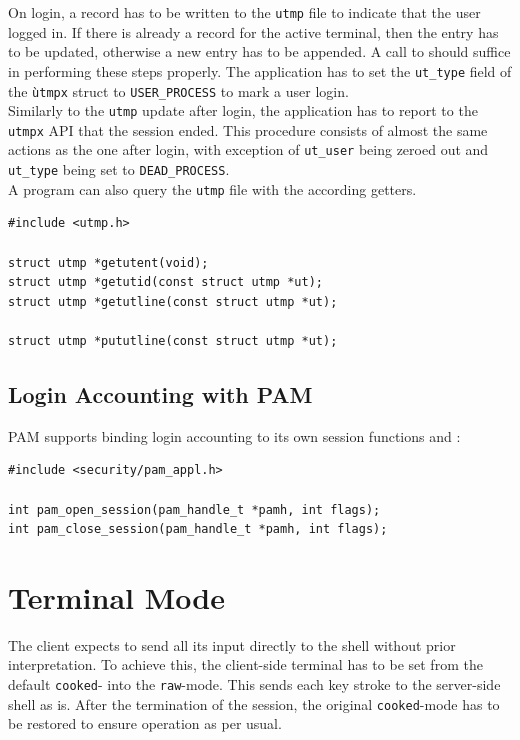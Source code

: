 \documentclass[10pt,a4paper,titlepage,twoside,english,final]{zhawreprt}
\begin{document}
On login, a record has to be written to the \texttt{utmp} file to indicate that the user logged in. If there is already a record for the active \gls{terminal}, then the entry has to be updated, otherwise a new entry has to be appended. A call to \cite{pututxline} should suffice in performing these steps properly. The application has to set the \texttt{ut\_type} field of the \texttt{ùtmpx} struct to \texttt{USER\_PROCESS} to mark a user login.\\
Similarly to the \texttt{utmp} update after login, the application has to report to the \texttt{utmpx} \gls{API} that the session ended. This procedure consists of almost the same actions as the one after login, with exception of \texttt{ut\_user} being zeroed out and \texttt{ut\_type} being set to \texttt{DEAD\_PROCESS}\citep[p.828]{KerriskTLPI}.\\
A program can also query the \texttt{utmp} file with the according getters.
\setlistingC
\begin{lstlisting}[caption={\texttt{utmpx} \gls{API} functions},label=lst:UtmpxApiFunctions]
#include <utmp.h>

struct utmp *getutent(void);
struct utmp *getutid(const struct utmp *ut);
struct utmp *getutline(const struct utmp *ut);

struct utmp *pututline(const struct utmp *ut);
\end{lstlisting}

\subsection{Login Accounting with PAM}\label{ssec:LoginAccountingWithPAM}
\gls{PAM} supports binding login accounting to its own session functions \cite{pam_open_session} and \cite{pam_close_session}:
\setlistingC
\begin{lstlisting}[caption={\gls{PAM} session management},label=lst:PAMSessionManagement]
#include <security/pam_appl.h>

int pam_open_session(pam_handle_t *pamh, int flags);
int pam_close_session(pam_handle_t *pamh, int flags);
\end{lstlisting}

\section{Terminal Mode}\label{sec:TerminalMode}
The client expects to send all its input directly to the \gls{shell} without prior interpretation. To achieve this, the client-side \gls{terminal} has to be set from the default \texttt{cooked}- into the \texttt{raw}-mode\citep[p.1309]{KerriskTLPI}. This sends each key stroke to the server-side \gls{shell} as is. After the termination of the session, the original \texttt{cooked}-mode has to be restored to ensure operation as per usual.
\end{document}
